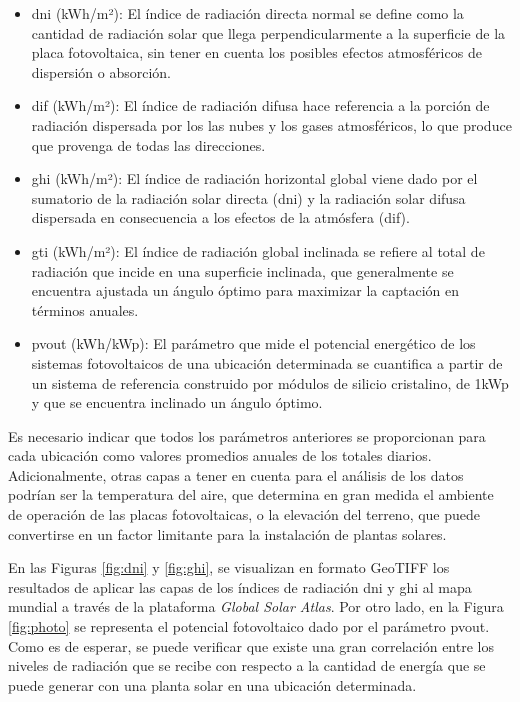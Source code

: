 \begin{itemize}    
    \item \gls{dni} (kWh/m²): El índice de radiación directa normal se define como la cantidad de radiación solar que llega perpendicularmente a la superficie de la placa fotovoltaica, sin tener en cuenta los posibles efectos atmosféricos de dispersión o absorción.
    \item \gls{dif} (kWh/m²): El índice de radiación difusa hace referencia a la porción de radiación dispersada por los las nubes y los gases atmosféricos, lo que produce que provenga de todas las direcciones.
    \item \gls{ghi} (kWh/m²): El índice de radiación horizontal global viene dado por el sumatorio de la radiación solar directa (\gls{dni}) y la radiación solar difusa dispersada en consecuencia a los efectos de la atmósfera (\gls{dif}).
    \item \gls{gti} (kWh/m²): El índice de radiación global inclinada se refiere al total de radiación que incide en una superficie inclinada, que generalmente se encuentra ajustada un ángulo óptimo para maximizar la captación en términos anuales. 
    \item \gls{pvout} (kWh/kWp): El parámetro que mide el potencial energético de los sistemas fotovoltaicos de una ubicación determinada se cuantifica a partir de un sistema de referencia construido por módulos de silicio cristalino, de 1kWp y que se encuentra inclinado un ángulo óptimo.
\end{itemize}

Es necesario indicar que todos los parámetros anteriores se proporcionan para cada ubicación como valores promedios anuales de los totales diarios. Adicionalmente, otras capas a tener en cuenta para el análisis de los datos podrían ser la temperatura del aire, que determina en gran medida el ambiente de operación de las placas fotovoltaicas, o la elevación del terreno, que puede convertirse en un factor limitante para la instalación de plantas solares. 

\vspace{3mm}

En las Figuras \ref{fig:dni} y \ref{fig:ghi}, se visualizan en formato GeoTIFF los resultados de aplicar las capas de los índices de radiación \gls{dni} y \gls{ghi} al mapa mundial a través de la plataforma \textit{Global Solar Atlas}. Por otro lado, en la Figura \ref{fig:photo} se representa el potencial fotovoltaico dado por el parámetro \gls{pvout}. Como es de esperar, se puede verificar que existe una gran correlación entre los niveles de radiación que se recibe con respecto a la cantidad de energía que se puede generar con una planta solar en una ubicación determinada. 

